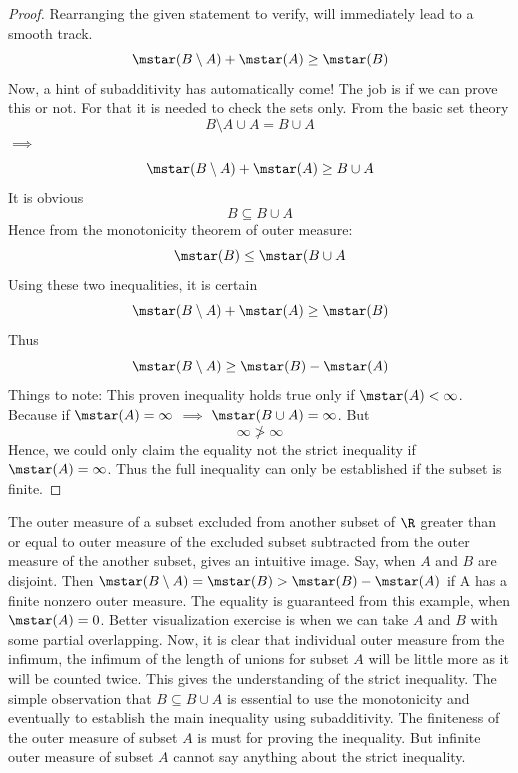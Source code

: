         \begin{proof}
            Rearranging the given statement to verify, will immediately lead to a smooth track.
            \[
            \mstar(B\setminus A) +\mstar(A)\geq \mstar(B) 
            \]
            Now, a hint of subadditivity has automatically come! The job is if we can prove this or not. For that it is needed to check the sets only. From the basic set theory
            \[
            B\setminus A \cup A = B \cup A
            \]
            $\implies$
            \[
            \mstar(B\setminus A) +\mstar(A)\geq B \cup A
            \]
            It is obvious
            \[
            B \subseteq B \cup A
            \]
            Hence from the monotonicity theorem of outer measure:
            \[
            \mstar(B) \leq \mstar(B\cup A
            \]
            Using these two inequalities, it is certain
            \[
            \mstar(B\setminus A) +\mstar(A)\geq \mstar(B) 
            \]
            Thus
            \[
            \mstar(B\setminus A)\geq \mstar(B) - \mstar(A)
            \]
            Things to note: This proven inequality holds true only if $\mstar(A) < \infty$. Because if $\mstar(A) = \infty$ $\implies$ $\mstar(B\cup A) =\infty$. But
            \[
            \infty \ngtr \infty
            \]
            Hence, we could only claim the equality not the strict inequality if $\mstar(A)=\infty$. Thus the full inequality can only be established if the subset is finite. 
        \end{proof}
        \begin{takeaway}
            The outer measure of a subset excluded from another subset of $\R$ greater than or equal to outer measure of the excluded subset subtracted from the outer measure of the another subset, gives an intuitive image. Say, when $A$ and $B$ are disjoint. Then $\mstar(B\setminus A)=\mstar(B)>\mstar(B)-\mstar(A)$ if A has a finite nonzero outer measure. The equality is guaranteed from this example, when $\mstar(A)=0$. Better visualization exercise is when we can take $A$ and $B$ with some partial overlapping. Now, it is clear that individual outer measure from the infimum, the infimum of the length of unions for subset $A$ will be little more as it will be counted twice. This gives the understanding of the strict inequality. The simple observation that $B \subseteq B\cup A$ is essential to use the monotonicity and eventually to establish the main inequality using subadditivity. The finiteness of the outer measure of subset $A$ is must for proving the inequality. But infinite outer measure of subset $A$ cannot say anything about the strict inequality. 
        \end{takeaway}

